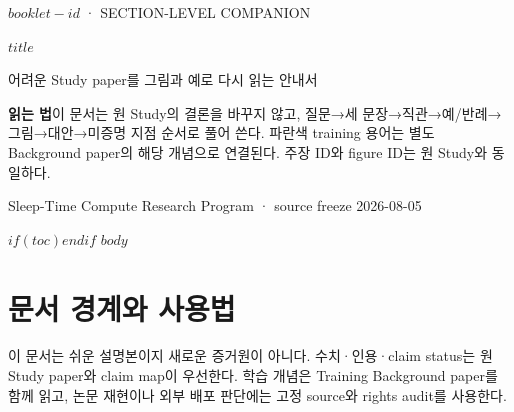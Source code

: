 \documentclass[11pt,a4paper,oneside]{report}
\begin{document}
\begin{titlepage}
\color{stcink}
\vspace*{10mm}
{\sffamily\small\color{stcteal}\MakeUppercase{$booklet-id$ · Section-level companion}\par}
\vspace{10mm}
{\sffamily\bfseries\fontsize{27}{33}\selectfont $title$\par}
\vspace{6mm}
{\Large 어려운 Study paper를 그림과 예로 다시 읽는 안내서\par}
\vfill
\begin{readingroute}
\textbf{읽는 법}\quad 이 문서는 원 Study의 결론을 바꾸지 않고, 질문→세 문장→직관→예/반례→그림→대안→미증명 지점 순서로 풀어 쓴다. 파란색 training 용어는 별도 Background paper의 해당 개념으로 연결된다. 주장 ID와 figure ID는 원 Study와 동일하다.
\end{readingroute}
\vspace{9mm}
{\small\color{stcblue}Sleep-Time Compute Research Program · source freeze 2026-08-05\par}
\end{titlepage}
$if(toc)$\tableofcontents\clearpage$endif$
$body$
\clearpage
\chapter*{문서 경계와 사용법}
이 문서는 쉬운 설명본이지 새로운 증거원이 아니다. 수치·인용·claim status는 원 Study paper와 claim map이 우선한다. 학습 개념은 Training Background paper를 함께 읽고, 논문 재현이나 외부 배포 판단에는 고정 source와 rights audit를 사용한다.
\end{document}

